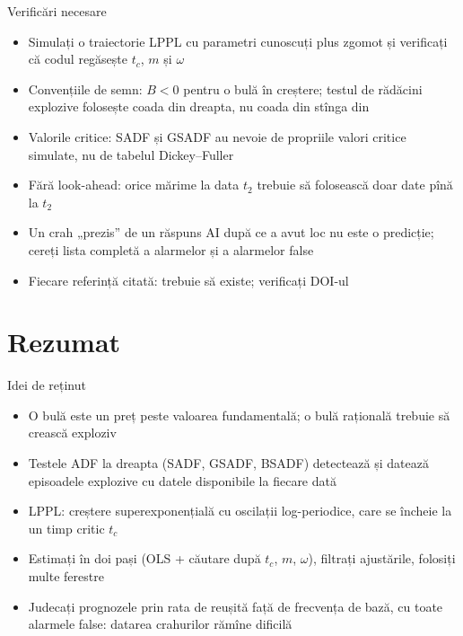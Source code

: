 \begin{frame}{Verificări necesare}
\itemsize{\small}
\begin{itemize}
    \item Simulați o traiectorie LPPL cu parametri cunoscuți plus zgomot și verificați că codul regăsește $t_c$, $m$ și $\omega$
    \item Convențiile de semn: $B < 0$ pentru o bulă în creștere; testul de rădăcini explozive folosește coada din dreapta, nu coada din stînga din 
    \item Valorile critice: SADF și GSADF au nevoie de propriile valori critice simulate, nu de tabelul Dickey--Fuller
    \item Fără look-ahead: orice mărime la data $t_2$ trebuie să folosească doar date pînă la $t_2$
    \item Un crah „prezis” de un răspuns AI după ce a avut loc nu este o predicție; cereți lista completă a alarmelor și a alarmelor false
    \item Fiecare referință citată: trebuie să existe; verificați DOI-ul
\end{itemize}
\end{frame}


\section{Rezumat}

\begin{frame}{Idei de reținut}
\itemsize{\small}
\begin{itemize}
    \item O bulă este un preț peste valoarea fundamentală; o bulă rațională trebuie să crească exploziv
    \item Testele ADF la dreapta (SADF, GSADF, BSADF) detectează și datează episoadele explozive cu datele disponibile la fiecare dată
    \item LPPL: creștere superexponențială cu oscilații log-periodice, care se încheie la un timp critic $t_c$
    \item Estimați în doi pași (OLS + căutare după $t_c$, $m$, $\omega$), filtrați ajustările, folosiți multe ferestre
    \item Judecați prognozele prin rata de reușită față de frecvența de bază, cu toate alarmele false: datarea crahurilor rămîne dificilă
\end{itemize}
\end{frame}

